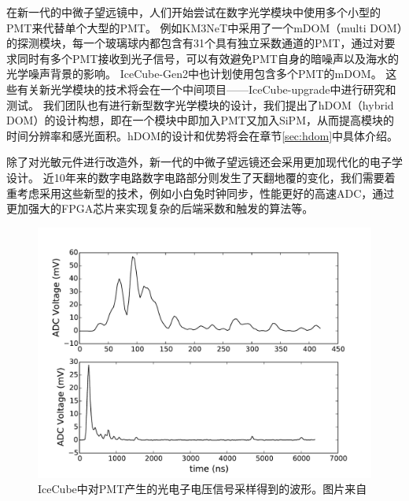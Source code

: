 在新一代的中微子望远镜中，人们开始尝试在数字光学模块中使用多个小型的PMT来代替单个大型的PMT。
例如KM3NeT中采用了一个mDOM（multi DOM）的探测模块，每一个玻璃球内都包含有31个具有独立采数通道的PMT，通过对要求同时有多个PMT接收到光子信号，可以有效避免PMT自身的暗噪声以及海水的光学噪声背景的影响\cite{KM3NeT_mDOM:2015}。
IceCube-Gen2中也计划使用包含多个PMT的mDOM\cite{IceCube-Gen2_mDOM:2021}。
这些有关新光学模块的技术将会在一个中间项目——IceCube-upgrade\cite{IceCube-upgrade:2019}中进行研究和测试\cite{IceCube_upgrade_mDOM:2021, IceCube_D-Egg:2022}。
我们团队也有进行新型数字光学模块的设计，我们提出了hDOM（hybrid DOM）\cite{hDOM:2021}的设计构想，即在一个模块中即加入PMT又加入SiPM，从而提高模块的时间分辨率和感光面积。hDOM的设计和优势将会在章节\ref{sec:hdom}中具体介绍。

除了对光敏元件进行改造外，新一代的中微子望远镜还会采用更加现代化的电子学设计。
近10年来的数字电路数字电路部分则发生了天翻地覆的变化，我们需要着重考虑采用这些新型的技术，例如小白兔时钟同步\cite{white_rabbit:2013}，性能更好的高速ADC\cite{Changda_PandaX_ADC:2021}，通过更加强大的FPGA芯片来实现复杂的后端采数和触发的算法等。

\begin{figure}[htb]
    \centering
    \includegraphics[width=0.8\linewidth]{img/IC_waveform.pdf}
    \caption{IceCube中对PMT产生的光电子电压信号采样得到的波形。图片来自\cite{IceCube_detector:2016}}
    \label{fig:IC_waveform}
\end{figure}

